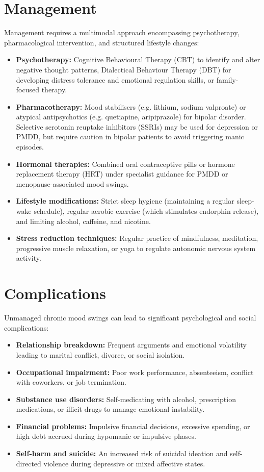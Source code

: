 \section*{Management}
Management requires a multimodal approach encompassing psychotherapy, pharmacological intervention, and structured lifestyle changes:
\begin{itemize}
    \item \textbf{Psychotherapy:} Cognitive Behavioural Therapy (CBT) to identify and alter negative thought patterns, Dialectical Behaviour Therapy (DBT) for developing distress tolerance and emotional regulation skills, or family-focused therapy.
    \item \textbf{Pharmacotherapy:} Mood stabilisers (e.g. lithium, sodium valproate) or atypical antipsychotics (e.g. quetiapine, aripiprazole) for bipolar disorder. Selective serotonin reuptake inhibitors (SSRIs) may be used for depression or PMDD, but require caution in bipolar patients to avoid triggering manic episodes.
    \item \textbf{Hormonal therapies:} Combined oral contraceptive pills or hormone replacement therapy (HRT) under specialist guidance for PMDD or menopause-associated mood swings.
    \item \textbf{Lifestyle modifications:} Strict sleep hygiene (maintaining a regular sleep-wake schedule), regular aerobic exercise (which stimulates endorphin release), and limiting alcohol, caffeine, and nicotine.
    \item \textbf{Stress reduction techniques:} Regular practice of mindfulness, meditation, progressive muscle relaxation, or yoga to regulate autonomic nervous system activity.
\end{itemize}

\section*{Complications}
Unmanaged chronic mood swings can lead to significant psychological and social complications:
\begin{itemize}
    \item \textbf{Relationship breakdown:} Frequent arguments and emotional volatility leading to marital conflict, divorce, or social isolation.
    \item \textbf{Occupational impairment:} Poor work performance, absenteeism, conflict with coworkers, or job termination.
    \item \textbf{Substance use disorders:} Self-medicating with alcohol, prescription medications, or illicit drugs to manage emotional instability.
    \item \textbf{Financial problems:} Impulsive financial decisions, excessive spending, or high debt accrued during hypomanic or impulsive phases.
    \item \textbf{Self-harm and suicide:} An increased risk of suicidal ideation and self-directed violence during depressive or mixed affective states.
\end{itemize}

